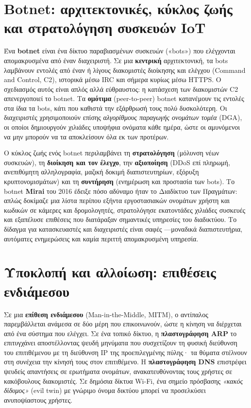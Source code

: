 \documentclass[11pt,openany]{book}
\begin{document}
\section{Botnet: αρχιτεκτονικές, κύκλος ζωής και στρατολόγηση συσκευών IoT}\label{sec:6.2}
Ένα \textbf{botnet} είναι ένα δίκτυο παραβιασμένων συσκευών («bots») που ελέγχονται απομακρυσμένα από έναν διαχειριστή. Σε μια \textbf{κεντρική} αρχιτεκτονική, τα bots λαμβάνουν εντολές από έναν ή λίγους διακομιστές διοίκησης και ελέγχου (Command and Control, C2), ιστορικά μέσω IRC και σήμερα κυρίως μέσω HTTPS. Ο σχεδιασμός αυτός είναι απλός αλλά εύθραυστος: η κατάσχεση των διακομιστών C2 απενεργοποιεί το botnet. Τα \textbf{ομότιμα} (peer-to-peer) botnet κατανέμουν τις εντολές στα ίδια τα bots, κάτι που καθιστά την εξάρθρωσή τους πολύ δυσκολότερη. Οι διαχειριστές χρησιμοποιούν επίσης \emph{αλγορίθμους παραγωγής ονομάτων τομέα} (DGA), οι οποίοι δημιουργούν χιλιάδες υποψήφια ονόματα κάθε ημέρα, ώστε οι αμυνόμενοι να μην μπορούν να τα αποκλείσουν όλα εκ των προτέρων.

Ο κύκλος ζωής ενός botnet περιλαμβάνει τη \textbf{στρατολόγηση} (μόλυνση νέων συσκευών), τη \textbf{διοίκηση και τον έλεγχο}, την \textbf{αξιοποίηση} (DDoS επί πληρωμή, ανεπιθύμητη αλληλογραφία, μαζική δοκιμή διαπιστευτηρίων, εξόρυξη κρυπτονομισμάτων) και τη \textbf{συντήρηση} (ενημέρωση και προστασία των bots). Το botnet \textbf{Mirai} του 2016 έδειξε πόσο αδύναμο ήταν το Διαδίκτυο των Πραγμάτων: απλώς δοκίμαζε μια λίστα περίπου εξήντα εργοστασιακών ονομάτων χρήστη και κωδικών σε κάμερες και δρομολογητές, στρατολόγησε εκατοντάδες χιλιάδες συσκευές και εξαπέλυσε επιθέσεις που διατάραξαν σημαντικές υπηρεσίες του διαδικτύου. Το δίδαγμα για κατασκευαστές και διαχειριστές είναι σαφές —μοναδικά διαπιστευτήρια, αυτόματες ενημερώσεις και καμία περιττή απομακρυσμένη υπηρεσία.

\section{Υποκλοπή και αλλοίωση: επιθέσεις ενδιάμεσου}\label{sec:6.3}
Σε μια \textbf{επίθεση ενδιάμεσου} (Man-in-the-Middle, MITM), ο αντίπαλος παρεμβάλλεται ανάμεσα σε δύο μέρη που επικοινωνούν, ώστε η κίνηση να διέρχεται από ένα σύστημα που ελέγχει. Σε ένα τοπικό δίκτυο, η \textbf{πλαστογράφηση ARP} το επιτυγχάνει αποστέλλοντας ψευδή μηνύματα που συσχετίζουν τη φυσική διεύθυνση του επιτιθέμενου με τη διεύθυνση IP της προεπιλεγμένης πύλης· τα θύματα στέλνουν στη συνέχεια την κίνησή τους στον επιτιθέμενο. Η \textbf{πλαστογράφηση DNS} επιστρέφει ψευδείς απαντήσεις σε ερωτήματα ονομάτων, ανακατευθύνοντας τους χρήστες σε κακόβουλους διακομιστές. Σε δημόσια δίκτυα Wi-Fi, ένα σημείο πρόσβασης \emph{«κακός δίδυμος»} (evil twin) με γνώριμο όνομα δικτύου μπορεί να προσελκύσει ανυποψίαστους χρήστες.
\end{document}
